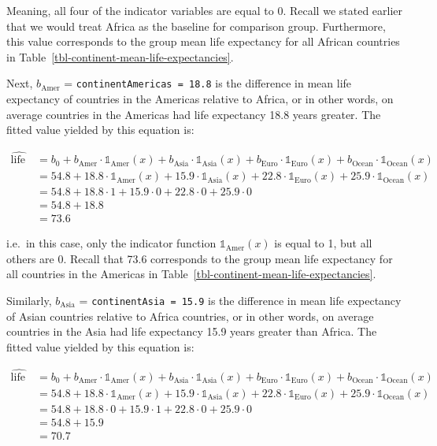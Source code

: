 \documentclass[
  letterpaper,
  DIV=11,
  numbers=noendperiod]{scrreprt}
\theoremstyle{definition}
\theoremstyle{remark}
\begin{document}
Meaning, all four of the indicator variables are equal to 0. Recall we
stated earlier that we would treat Africa as the baseline for comparison
group. Furthermore, this value corresponds to the group mean life
expectancy for all African countries in
Table~\ref{tbl-continent-mean-life-expectancies}.

Next, \(b_{\text{Amer}}\) = \texttt{continentAmericas\ =\ 18.8} is the
difference in mean life expectancy of countries in the Americas relative
to Africa, or in other words, on average countries in the Americas had
life expectancy 18.8 years greater. The fitted value yielded by this
equation is:

\[
\begin{aligned}
\widehat{\text{life exp}} &= b_0 + b_{\text{Amer}}\cdot\mathbb{1}_{\mbox{Amer}}(x) + b_{\text{Asia}}\cdot\mathbb{1}_{\mbox{Asia}}(x)
+ b_{\text{Euro}}\cdot\mathbb{1}_{\mbox{Euro}}(x) + b_{\text{Ocean}}\cdot\mathbb{1}_{\mbox{Ocean}}(x)\\
&= 54.8 + 18.8\cdot\mathbb{1}_{\mbox{Amer}}(x) + 15.9\cdot\mathbb{1}_{\mbox{Asia}}(x)
+ 22.8\cdot\mathbb{1}_{\mbox{Euro}}(x) + 25.9\cdot\mathbb{1}_{\mbox{Ocean}}(x)\\
&= 54.8 + 18.8\cdot 1 + 15.9\cdot 0 + 22.8\cdot 0 + 25.9\cdot 0\\
&= 54.8 + 18.8\\
&= 73.6
\end{aligned}
\]

i.e.~in this case, only the indicator function
\(\mathbb{1}_{\mbox{Amer}}(x)\) is equal to 1, but all others are 0.
Recall that 73.6 corresponds to the group mean life expectancy for all
countries in the Americas in
Table~\ref{tbl-continent-mean-life-expectancies}.

Similarly, \(b_{\text{Asia}}\) = \texttt{continentAsia\ =\ 15.9} is the
difference in mean life expectancy of Asian countries relative to Africa
countries, or in other words, on average countries in the Asia had life
expectancy 15.9 years greater than Africa. The fitted value yielded by
this equation is:

\[
\begin{aligned}
\widehat{\text{life exp}} &= b_0 + b_{\text{Amer}}\cdot\mathbb{1}_{\mbox{Amer}}(x) + b_{\text{Asia}}\cdot\mathbb{1}_{\mbox{Asia}}(x)
+ b_{\text{Euro}}\cdot\mathbb{1}_{\mbox{Euro}}(x) + b_{\text{Ocean}}\cdot\mathbb{1}_{\mbox{Ocean}}(x)\\
&= 54.8 + 18.8\cdot\mathbb{1}_{\mbox{Amer}}(x) + 15.9\cdot\mathbb{1}_{\mbox{Asia}}(x)
+ 22.8\cdot\mathbb{1}_{\mbox{Euro}}(x) + 25.9\cdot\mathbb{1}_{\mbox{Ocean}}(x)\\
&= 54.8 + 18.8\cdot 0 + 15.9\cdot 1 + 22.8\cdot 0 + 25.9\cdot 0\\
&= 54.8 + 15.9\\
&= 70.7
\end{aligned}
\]
\end{document}
